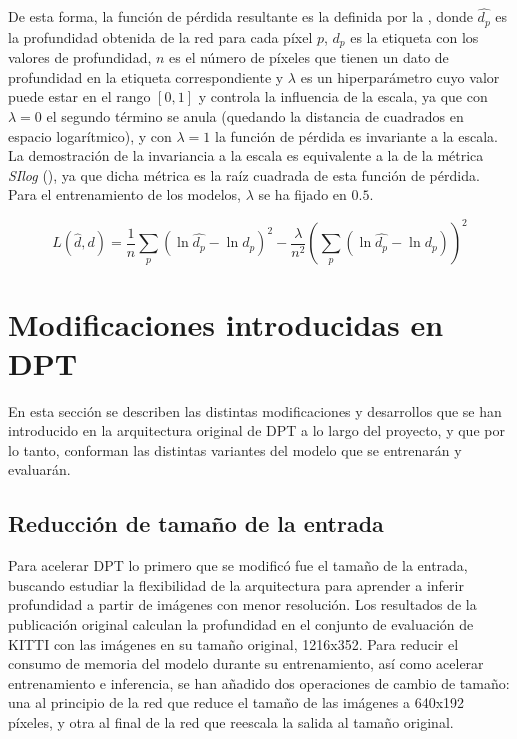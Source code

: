 De esta forma, la función de pérdida resultante es la definida por la , donde $\hat{d_p}$ es la profundidad obtenida de la red para cada píxel $p$, $d_p$ es la etiqueta con los valores de profundidad, $n$ es el número de píxeles que tienen un dato de profundidad en la etiqueta correspondiente y $\lambda$ es un hiperparámetro cuyo valor puede estar en el rango $[0, 1]$ y controla la influencia de la escala, ya que con $\lambda=0$ el segundo término se anula (quedando la distancia de cuadrados en espacio logarítmico), y con $\lambda=1$ la función de pérdida es invariante a la escala. La demostración de la invariancia a la escala es equivalente a la de la métrica \textit{SIlog} (), ya que dicha métrica es la raíz cuadrada de esta función de pérdida. Para el entrenamiento de los modelos, $\lambda$ se ha fijado en $0.5$.

\begin{equation}
\label{eqn:perdida-midas}
L(\hat{d}, d) = \frac{1}{n}\sum_{p} (\ln{\hat{d_p}} - \ln{d_p})^2 - \frac{\lambda}{n^2} \left( \sum_{p} (\ln{\hat{d_p}} - \ln{d_p}) \right)^2
\end{equation}

\section{Modificaciones introducidas en DPT}
En esta sección se describen las distintas modificaciones y desarrollos que se han introducido en la arquitectura original de DPT a lo largo del proyecto, y que por lo tanto, conforman las distintas variantes del modelo que se entrenarán y evaluarán.

\subsection{Reducción de tamaño de la entrada}
Para acelerar DPT lo primero que se modificó fue el tamaño de la entrada, buscando estudiar la flexibilidad de la arquitectura para aprender a inferir profundidad a partir de imágenes con menor resolución. Los resultados de la publicación original calculan la profundidad en el conjunto de evaluación de KITTI con las imágenes en su tamaño original, 1216x352. Para reducir el consumo de memoria del modelo durante su entrenamiento, así como acelerar entrenamiento e inferencia, se han añadido dos operaciones de cambio de tamaño: una al principio de la red que reduce el tamaño de las imágenes a 640x192 píxeles, y otra al final de la red que reescala la salida al tamaño original. 

